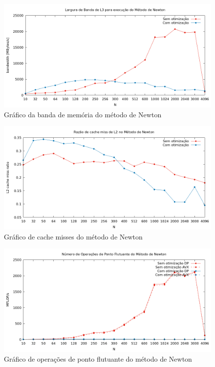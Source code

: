 \documentclass{article}
\begin{document}
\begin{figure}[htp]
    \centering
    \includegraphics[width=12cm]{l3_newton.png}
    \caption{Gráfico da banda de memória do método de Newton}
    \label{fig:l3_newton}
\end{figure}

\begin{figure}[htp]
    \centering
    \includegraphics[width=12cm]{l2cache_newton.png}
    \caption{Gráfico de cache misses do método de Newton}
    \label{fig:l2_newton}
\end{figure}

\begin{figure}[htp]
    \centering
    \includegraphics[width=12cm]{flops_dp_newton.png}
    \caption{Gráfico de operações de ponto flutuante do método de Newton}
    \label{fig:flops_newton}
\end{figure}
\end{document}
